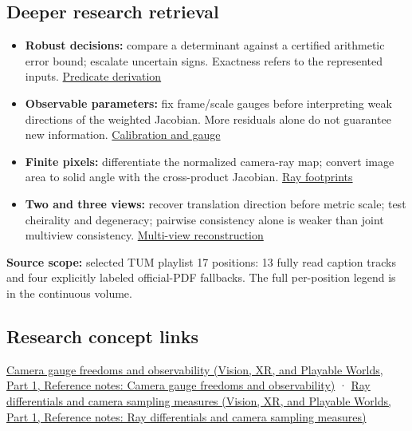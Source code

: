 \subsection{Deeper research retrieval}\label{appendix-a2b71a18f5a2-deeper-research-retrieval}

\hypertarget{appendix-a2b71a18f5a2-deeper-research-retrieval}{}

\begin{itemize}
\tightlist
\item
  \textbf{Robust decisions:} compare a determinant against a certified arithmetic error bound; escalate uncertain signs. Exactness refers to the represented inputs. \hyperref[02-foundations-ii-ch034-a-sign-can-matter-more-than-a-coordinate-robust-predicates]{Predicate derivation}
\item
  \textbf{Observable parameters:} fix frame/scale gauges before interpreting weak directions of the weighted Jacobian. More residuals alone do not guarantee new information. \hyperref[02-foundations-ii-ch036-calibration-needs-informative-observations-and-a-fixed-gauge]{Calibration and gauge}
\item
  \textbf{Finite pixels:} differentiate the normalized camera-ray map; convert image area to solid angle with the cross-product Jacobian. \hyperref[02-foundations-ii-ch036-a-camera-ray-carries-a-pixel-footprint]{Ray footprints}
\item
  \textbf{Two and three views:} recover translation direction before metric scale; test cheirality and degeneracy; pairwise consistency alone is weaker than joint multiview consistency. \hyperref[02-foundations-ii-ch036-calibrated-two-view-geometry-direction-before-distance]{Multi-view reconstruction}
\end{itemize}

\textbf{Source scope:} selected TUM playlist 17 positions: 13 fully read caption tracks and four explicitly labeled official-PDF fallbacks. The full per-position legend is in {the continuous volume}.

\subsection{Research concept links}\label{appendix-a2b71a18f5a2-research-concept-links}

\hypertarget{appendix-a2b71a18f5a2-research-concept-links}{}

\href{../07-Vision-XR-and-Playable-Worlds-P01/main.pdf\#appendix-113f0267e5f4}{Camera gauge freedoms and observability (Vision, XR, and Playable Worlds, Part 1, Reference notes: Camera gauge freedoms and observability)} · \href{../07-Vision-XR-and-Playable-Worlds-P01/main.pdf\#appendix-8c40fad29462}{Ray differentials and camera sampling measures (Vision, XR, and Playable Worlds, Part 1, Reference notes: Ray differentials and camera sampling measures)}
